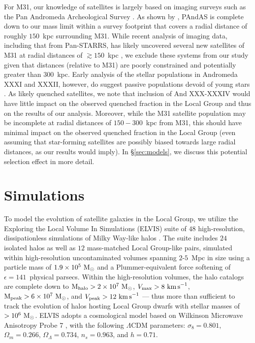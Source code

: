 \documentclass[usenatbib]{mn2e}
\newcommand{\msun}{{\rm M}_{\odot}}
\newcommand{\kms}{{\rm km \, s}^{-1}}
\begin{document}
For M31, our knowledge of satellites is largely based on imaging
surveys such as the Pan Andromeda Archeological Survey
\citep[PAndAS,][see also
\citealt{ferguson02,ibata07,mcconnachie08}]{mcconnachie09}. As shown
by \citet{brasseur11}, PAndAS is complete down to our mass limit
within a survey footprint that covers a radial distance of roughly
$150$~kpc surrounding M31. While recent analysis of imaging data,
including that from Pan-STARRS, has likely uncovered several new
satellites of M31 at radial distances of $\gtrsim 150$~kpc \citep[And
XXX-XXXIV,][]{conn12, martin13a, martin13b, martin14}, we exclude
these systems from our study given that distances (relative to M31)
are poorly constrained and potentially greater than $300$~kpc. Early
analysis of the stellar populations in Andromeda XXXI and XXXII,
however, do suggest passive populations devoid of young stars
\citep{martin13a}. As likely quenched satellites, we note that
inclusion of And XXX-XXXIV would have little impact on the observed
quenched fraction in the Local Group and thus on the results of our
analysis. Moreover, while the M31 satellite population may be
incomplete at radial distances of $150 - 300$~kpc from M31, this
should have minimal impact on the observed quenched fraction in the
Local Group (even assuming that star-forming satellites are possibly
biased towards large radial distances, as our results would imply). In
\S\ref{sec:models}, we discuss this potential selection effect in more
detail.





\section{Simulations}
\label{sec:ELVIS}


To model the evolution of satellite galaxies in the Local Group, we
utilize the Exploring the Local Volume In Simulations (ELVIS) suite of
$48$ high-resolution, dissipationless simulations of Milky Way-like
halos \citep{gk14}. The suite includes $24$ isolated halos as well as
$12$ mass-matched Local Group-like pairs, simulated within
high-resolution uncontaminated volumes spanning $2$-$5$~Mpc in size
using a particle mass of $1.9 \times 10^{5}~\msun$ and a
Plummer-equivalent force softening of $\epsilon = 141$~physical
parsecs. Within the high-resolution volumes, the halo catalogs are
complete down to ${\rm M}_{\rm halo} > 2 \times 10^{7}~\msun$, $V_{\rm
  max} > 8~\kms$, ${\rm M}_{\rm peak} > 6 \times 10^{7}~\msun$, and
$V_{\rm peak} > 12~\kms$ --- thus more than sufficient to track the
evolution of halos hosting Local Group dwarfs with stellar masses of
$> 10^{6}~\msun$. ELVIS adopts a cosmological model based on
{Wilkinson Microwave Anisotropy Probe 7} \citep{komatsu11}, with the
following $\Lambda$CDM parameters: $\sigma_{8}=0.801$,
$\Omega_{m}=0.266$, $\Omega_{\Lambda}=0.734$, $n_{s}=0.963$, and
$h=0.71$.
\end{document}
